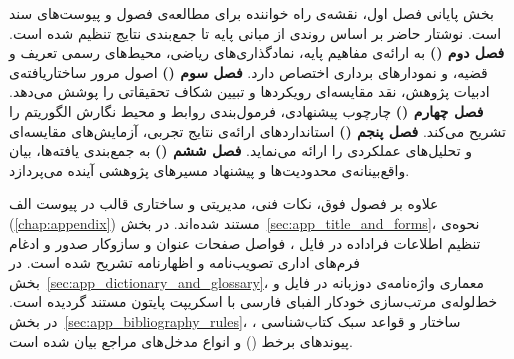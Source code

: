 بخش پایانی فصل اول، نقشه‌ی راه خواننده برای مطالعه‌ی فصول و پیوست‌های سند است. نوشتار حاضر بر اساس روندی از مبانی پایه تا جمع‌بندی نتایج تنظیم شده است. \textbf{فصل دوم ()} به ارائه‌ی مفاهیم پایه، نمادگذاری‌های ریاضی، محیط‌های رسمی تعریف و قضیه، و نمودارهای برداری اختصاص دارد. \textbf{فصل سوم ()} اصول مرور ساختاریافته‌ی ادبیات پژوهش، نقد مقایسه‌ای رویکردها و تبیین شکاف تحقیقاتی را پوشش می‌دهد. \textbf{فصل چهارم ()} چارچوب پیشنهادی، فرمول‌بندی روابط و محیط نگارش الگوریتم را تشریح می‌کند. \textbf{فصل پنجم ()} استانداردهای ارائه‌ی نتایج تجربی، آزمایش‌های مقایسه‌ای و تحلیل‌های عملکردی را ارائه می‌نماید. \textbf{فصل ششم ()} به جمع‌بندی یافته‌ها، بیان واقع‌بینانه‌ی محدودیت‌ها و پیشنهاد مسیرهای پژوهشی آینده می‌پردازد.

علاوه بر فصول فوق، نکات فنی، مدیریتی و ساختاری قالب در پیوست الف (\ref{chap:appendix}) مستند شده‌اند. در بخش~\ref{sec:app_title_and_forms}، نحوه‌ی تنظیم اطلاعات فراداده در فایل ، فواصل صفحات عنوان و سازوکار صدور و ادغام فرم‌های اداری تصویب‌نامه و اظهارنامه تشریح شده است. در بخش~\ref{sec:app_dictionary_and_glossary}، معماری واژه‌نامه‌ی دوزبانه در فایل  و خط‌لوله‌ی مرتب‌سازی خودکار الفبای فارسی با اسکریپت پایتون مستند گردیده است. در بخش~\ref{sec:app_bibliography_rules}، ساختار و قواعد سبک کتاب‌شناسی ، پیوندهای برخط () و انواع مدخل‌های مراجع بیان شده است.
